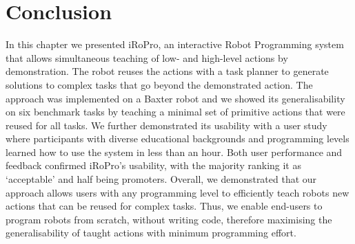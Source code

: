 \section{Conclusion} 
\label{sec:conclusion}
In this chapter we presented iRoPro, an interactive Robot Programming system that allows simultaneous teaching of low- and high-level actions by demonstration.
The robot reuses the actions with a task planner to generate solutions to complex tasks that go beyond the demonstrated action.
The approach was implemented on a Baxter robot and we showed its generalisability on six benchmark tasks by teaching a minimal set of primitive actions that were reused for all tasks.
We further demonstrated its usability with a user study where participants with diverse educational backgrounds and programming levels learned how to use the system in less than an hour.
Both user performance and feedback confirmed iRoPro's usability, with the majority ranking it as `acceptable' and half being promoters.
Overall, we demonstrated that our approach allows users with any programming level to efficiently teach robots new actions that can be reused for complex tasks.
Thus, we enable end-users to program robots from scratch, without writing code, therefore maximising the generalisability of taught actions with minimum programming effort.